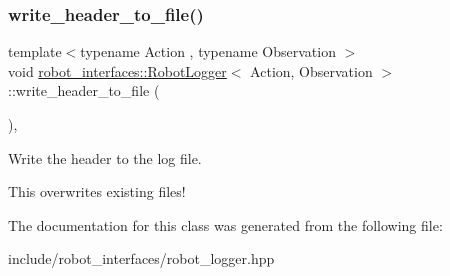 \subsubsection{\texorpdfstring{write\+\_\+header\+\_\+to\+\_\+file()}{write\_header\_to\_file()}}
{\footnotesize\ttfamily template$<$typename Action , typename Observation $>$ \\
void \hyperlink{classrobot__interfaces_1_1RobotLogger}{robot\+\_\+interfaces\+::\+Robot\+Logger}$<$ Action, Observation $>$\+::write\+\_\+header\+\_\+to\+\_\+file (\begin{DoxyParamCaption}{ }\end{DoxyParamCaption})\hspace{0.3cm}{\ttfamily [inline]}, {\ttfamily [private]}}



Write the header to the log file. 

This overwrites existing files! 

The documentation for this class was generated from the following file\+:\begin{DoxyCompactItemize}
\item 
include/robot\+\_\+interfaces/robot\+\_\+logger.\+hpp\end{DoxyCompactItemize}
